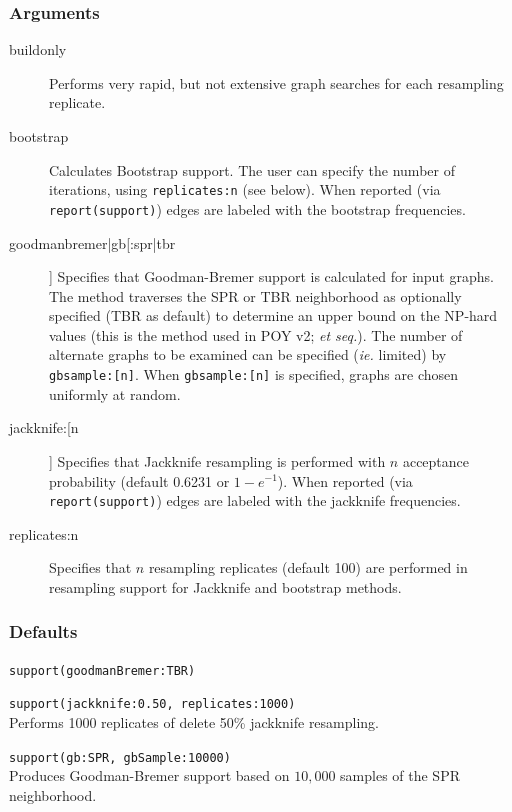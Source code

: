 	\subsubsection{Arguments}
		\begin{description}
			\item[buildonly] Performs very rapid, but not extensive graph searches for each 
			resampling replicate.
		
			\item[bootstrap] Calculates Bootstrap support. The user can specify the 
			number of iterations, using \texttt{replicates:n} (see below).
			When reported (via \texttt{report(support)}) edges are labeled with the bootstrap frequencies.
		
			\item[goodmanbremer|gb[:spr|tbr]] Specifies that Goodman-Bremer support is 
			calculated for input graphs. The method traverses the SPR or TBR neighborhood 
			as optionally specified (TBR as default) to determine an upper bound on the NP-hard 
			values (this is the method used in POY v2; \citealp{POY2} \textit{et seq.}). The number 
			of alternate graphs to be examined can be specified (\textit{ie.} limited) by \texttt{gbsample:[n]}. 
			When \texttt{gbsample:[n]} is specified, graphs are chosen uniformly at random.
		
			\item[jackknife:[n]] Specifies that Jackknife resampling is performed with $n$ acceptance 
			probability (default 0.6231 or $1 - e^{-1}$). When reported (via \texttt{report(support)}) 
			edges are labeled with the jackknife frequencies.
		
			\item[replicates:n] Specifies that $n$ resampling replicates (default 100) are performed 
			in resampling support for Jackknife and bootstrap methods.
		\end{description}	
		\subsubsection{Defaults}
			\texttt{support(goodmanBremer:TBR)}
		

		\begin{example}
			\item{\texttt{support(jackknife:0.50, replicates:1000)}\\Performs 1000 replicates of 
			delete 50\% jackknife resampling.}
				
			\item{\texttt{support(gb:SPR, gbSample:10000)}\\Produces Goodman-Bremer 
			support based on $10,000$ samples of the SPR neighborhood.}
		\end{example}

